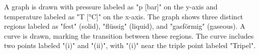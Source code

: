 A graph is drawn with pressure labeled as "p [bar]" on the y-axis and temperature labeled as "T [°C]" on the x-axis. The graph shows three distinct regions labeled as "fest" (solid), "flüssig" (liquid), and "gasförmig" (gaseous). A curve is drawn, marking the transition between these regions. The curve includes two points labeled "(i)" and "(ii)", with "(i)" near the triple point labeled "Tripel".
